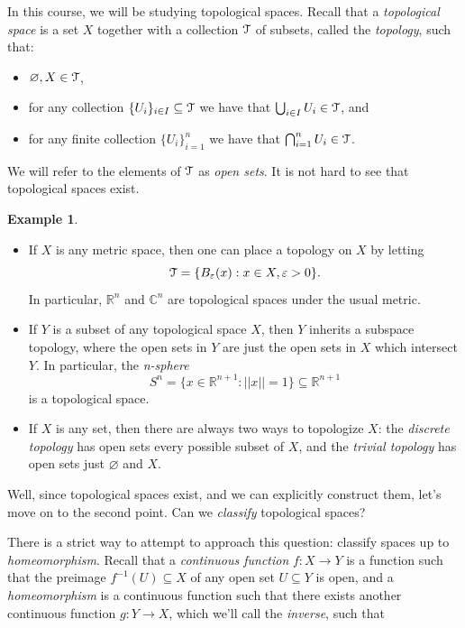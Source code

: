 \documentclass[10pt]{amsart}
\newcommand{\euscr}[1]{\EuScript{#1}}
\theoremstyle{definition}
\newtheorem{ex}[thm]{Example}
\newcommand{\cdef}[1]{\textcolor{Bittersweet}{#1}}
\begin{document}
In this course, we will be studying topological spaces. Recall that a \emph{\cdef{topological space}} is a set $X$ together with a collection $\euscr{T}$ of subsets, called the \cdef{\emph{topology}}, such that:
\begin{itemize}
    \item $\varnothing, X \in \euscr{T}$,
    \item for any collection $\{U_i\}_{i \in I} \subseteq \euscr{T}$ we have that $\bigcup_{i \in I}U_i \in \euscr{T}$, and
    \item for any finite collection $\{U_i\}_{i=1}^n$ we have that $\bigcap_{i=1}^n U_i \in \euscr{T}$.
\end{itemize}
We will refer to the elements of $\euscr{T}$ as \cdef{\emph{open sets}}. It is not hard to see that topological spaces exist. 
\begin{ex}
\hfill
    \begin{itemize}
        \item If $X$ is any metric space, then one can place a topology on $X$ by letting 
        \[\euscr{T} = \{B_{\varepsilon}(x): x \in X, \varepsilon>0\}.\]
        In particular, $\mathbb{R}^n$ and $\mathbb{C}^n$ are topological spaces under the usual metric.
        \item If $Y$ is a subset of any topological space $X$, then $Y$ inherits a subspace topology, where the open sets in $Y$ are just the open sets in $X$ which intersect $Y$. In particular, the \cdef{\emph{n-sphere}}
        \[S^n = \{x \in \mathbb{R}^{n+1}: ||x||=1\} \subseteq \mathbb{R}^{n+1}\]
        is a topological space.
        \item If $X$ is any set, then there are always two ways to topologize $X$: the \cdef{\emph{discrete topology}} has open sets every possible subset of $X$, and the \cdef{\emph{trivial topology}} has open sets just $\varnothing$ and $X$.
    \end{itemize}
\end{ex}
Well, since topological spaces exist, and we can explicitly construct them, let's move on to the second point. Can we \emph{classify} topological spaces?

There is a strict way to attempt to approach this question: classify spaces up to \emph{homeomorphism}. Recall that a \cdef{\emph{continuous function}} $f:X \to Y$ is a function such that the preimage $f^{-1}(U) \subseteq X$ of any open set $U \subseteq Y$ is open, and a \cdef{\emph{homeomorphism}} is a continuous function such that there exists another continuous function $g:Y \to X$, which we'll call the \cdef{\emph{inverse}}, such that
\end{document}
